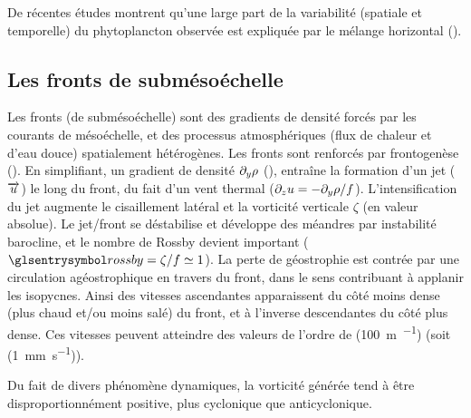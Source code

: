 De récentes études montrent qu'une large part de la variabilité (spatiale et temporelle) du phytoplancton observée est expliquée par le mélange horizontal (\cite{glover_2018,keerthi_2022,jonsson_2023}).



\subsection{Les fronts de submésoéchelle}

Les fronts (de submésoéchelle) sont des gradients de densité forcés par les courants de mésoéchelle, et des processus atmosphériques (flux de chaleur et d'eau douce) spatialement hétérogènes.
Les fronts sont renforcés par frontogenèse (\cite{thomas_2008,mcwilliams_2016}).
En simplifiant, un gradient de densité \(\textder{\rho}{y}\) (), entraîne la formation d'un jet (\(\vect{u}\)) le long du front, du fait d'un vent thermal (\(\textder{u}{z} = -\textder{\rho}{y} / f\)).
L'intensification du jet augmente le cisaillement latéral et la vorticité verticale \(\zeta\) (en valeur absolue).
Le jet/front se déstabilise et développe des méandres par instabilité barocline, et le nombre de Rossby devient important (\(\am{rossby} = \zeta / f \simeq 1\)).
La perte de géostrophie est contrée par une circulation agéostrophique en travers du front, dans le sens contribuant à applanir les isopycnes.
Ainsi des vitesses ascendantes apparaissent du côté moins dense (plus chaud et/ou moins salé) du front, et à l'inverse descendantes du côté plus dense.
Ces vitesses peuvent atteindre des valeurs de l'ordre de \OM(\qty{100}{\meter\per\jr}) (soit \OM(\qty{1}{\mm\per\s})).

\begin{note}
  Du fait de divers phénomène dynamiques, la vorticité générée tend à être disproportionnément positive,  plus cyclonique que anticyclonique.
\end{note}

\begin{figure}
  \centering
  \label{fig:frontogenesis}
\end{figure}

